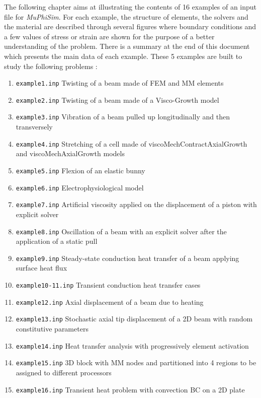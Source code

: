 \documentclass[oneside,11pt,times]{book}
\begin{document}
The following chapter aims at illustrating the contents of 16 examples of an input file for \textit{MuPhiSim}. For each example, the structure of elements, the solvers and the material are described through several figures where boundary conditions and a few values of stress or strain are shown for the purpose of a better understanding of the problem. There is a summary at the end of this document which presents the main data of each example. These 5 examples are built to study the following problems :

\begin{enumerate}
\item \texttt{example1.inp} Twisting of a beam made of FEM and MM elements
\item \texttt{example2.inp} Twisting of a beam made of a Visco-Growth model
\item \texttt{example3.inp} Vibration of a beam pulled up longitudinally and then transversely
\item \texttt{example4.inp} Stretching of a cell made of viscoMechContractAxialGrowth and viscoMechAxialGrowth models
\item \texttt{example5.inp} Flexion of an elastic bunny
\item \texttt{example6.inp} Electrophysiological model
\item \texttt{example7.inp} Artificial viscosity applied on the displacement of a piston with explicit solver
\item \texttt{example8.inp} Oscillation of a beam with an explicit solver after the application of a static pull
\item \texttt{example9.inp} Steady-state conduction heat transfer of a beam applying surface heat flux
\item \texttt{example10-11.inp} Transient conduction heat transfer cases
\item \texttt{example12.inp} Axial displacement of a beam due to heating
\item \texttt{example13.inp} Stochastic axial tip displacement of a 2D beam with random constitutive parameters
\item \texttt{example14.inp} Heat transfer analysis with progressively element activation
\item \texttt{example15.inp} 3D block with MM nodes and  partitioned into 4 regions to be assigned to different processors
\item \texttt{example16.inp} Transient heat problem with convection BC on a 2D plate
\end{enumerate}
\end{document}
